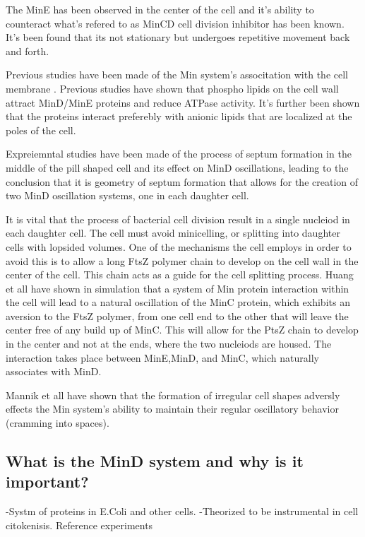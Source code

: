 \documentclass[letterpaper,twocolumn,amsmath,amssymb,pre]{revtex4-1}
\begin{document}
The MinE has been observed in the center of the cell and it's ability
to counteract what's refered to as MinCD cell division inhibitor has
been known.  It's been found that its not stationary but undergoes
repetitive movement back and forth. \cite{fu2001mine}

Previous studies have been made of the Min system's associtation with
the cell membrane
\cite{hsieh2010direct}\cite{mileykovskaya2003effects}. Previous
studies have shown that phospho lipids on the cell wall attract
MinD/MinE proteins and reduce ATPase activity.  It's further been
shown that the proteins interact preferebly with anionic lipids that
are localized at the poles of the cell.\cite{renner2012mind}


Expreiemntal studies have been made of the process of septum formation
in the middle of the pill shaped cell and its effect on MinD
oscillations, leading to the conclusion that it is geometry of septum
formation that allows for the creation of two MinD oscillation systems, one
in each daughter cell. \cite{juarez2010changes}

It is vital that the process of bacterial cell division result in a single
nucleiod in each daughter cell.  The cell must avoid minicelling, or
splitting into daughter cells with lopsided volumes.  One of the mechanisms
the cell employs in order to avoid this is to allow a long FtsZ polymer
chain to develop on the cell wall in the center of the cell.  This chain
acts as a guide for the cell splitting process.  Huang et all have shown in
simulation that a system of Min protein interaction within the cell will
lead to a natural oscillation of the MinC protein, which exhibits an
aversion to the FtsZ polymer, from one cell end to the other that will
leave the center free of any build up of MinC.  This will allow for the
PtsZ chain to develop in the center and not at the ends, where the two
nucleiods are housed.  The interaction takes place between MinE,MinD, and
MinC, which naturally associates with MinD.

Mannik et all have shown that the formation of irregular cell shapes
adversly effects the Min system's ability to maintain their regular
oscillatory behavior (cramming into spaces).

\subsection{What is the MinD system and why is it important?}


-Systm of proteins in E.Coli and other cells.
-Theorized to be instrumental in cell citokenisis. Reference experiments
\end{document}
